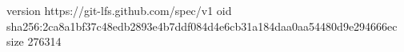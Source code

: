 version https://git-lfs.github.com/spec/v1
oid sha256:2ca8a1bf37c48edb2893e4b7ddf084d4e6cb31a184daa0aa54480d9e294666ec
size 276314
